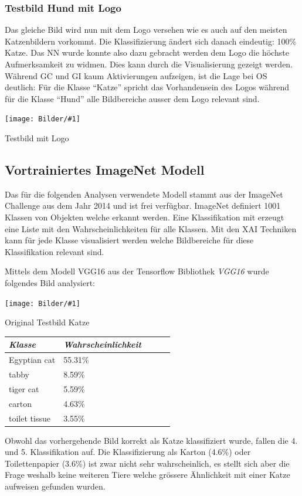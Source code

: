 \documentclass[
  12pt, %
  a4paper, %
  oneside, %
  openany, 
  numbers=noenddot, %
  BCOR=5mm, %
  parskip=half*, %
  thesis, %
]{bfhbook}
\newcommand{\imgText}[3]{
\begin{center}
    \begin{minipage}[t]{0.6\textwidth}
    		\vspace{0pt}
		\texttt{[image: Bilder/\#1]}
		\caption{#2}
	\end{minipage}\hfill
    \begin{minipage}[t]{0.4\textwidth}
    		\vspace{0pt}
  		#3
    \end{minipage}
\end{center}
}
\newcommand{\fullImg}[2]{
\begin{center}
\begin{minipage}[t]{\linewidth}
\texttt{[image: Bilder/\#1]}
\caption{#2}
\end{minipage}
\end{center}
}
\begin{document}
\subsubsection*{Testbild Hund mit Logo}
Das gleiche Bild wird nun mit dem Logo versehen wie es auch auf den meisten Katzenbildern vorkommt. Die Klassifizierung ändert sich danach eindeutig: 100\% Katze. Das \Gls{NN} wurde konnte also dazu gebracht werden dem Logo die höchste Aufmerksamkeit zu widmen. Dies kann durch die Visualisierung gezeigt werden. Während \Gls{GC} und \Gls{GI} kaum Aktivierungen aufzeigen, ist die Lage bei \Gls{OS} deutlich: Für die Klasse ``Katze'' spricht das Vorhandensein des Logos während für die Klasse ``Hund'' alle Bildbereiche ausser dem Logo relevant sind.
\fullImg{Manipulated_case_img8.png}{Testbild mit Logo}

\subsection{Vortrainiertes ImageNet Modell}
Das für die folgenden Analysen verwendete Modell \parencite{Simonyan2014} stammt aus der ImageNet Challenge \parencite{imageNet} aus dem Jahr 2014 und ist frei verfügbar. ImageNet definiert 1001 Klassen von Objekten welche erkannt werden. Eine Klassifikation mit \parencite{TensorFlow} erzeugt eine Liste mit den Wahrscheinlichkeiten für alle Klassen. Mit den \gls{XAI} Techniken kann für jede Klasse visualisiert werden welche Bildbereiche für diese Klassifikation relevant sind.

Mittels dem Modell VGG16 aus der Tensorflow Bibliothek \textit{VGG16} \cite{vgg16} wurde folgendes Bild analysiert:
\imgText{Mira.jpg}{Original Testbild Katze}{
		
		\begin{tabular}{@{} *5l @{}}    \toprule
		\emph{Klasse} & \emph{Wahrscheinlichkeit} &&&  \\\midrule
		Egyptian cat & 55.31\% \\ 
		 tabby & 8.59\% \\ 
		 tiger cat & 5.59\% \\ 
		 carton & 4.63\% \\
		 toilet tissue & 3.55\% \\ \bottomrule
		 \hline
		\end{tabular}
}

Obwohl das vorhergehende Bild korrekt als Katze klassifiziert wurde, fallen die 4. und 5. Klassifikation auf. Die Klassifizierung als Karton (4.6\%) oder Toilettenpapier (3.6\%) ist zwar nicht sehr wahrscheinlich, es stellt sich aber die Frage weshalb keine weiteren Tiere welche grössere Ähnlichkeit mit einer Katze aufweisen gefunden wurden.
\end{document}
